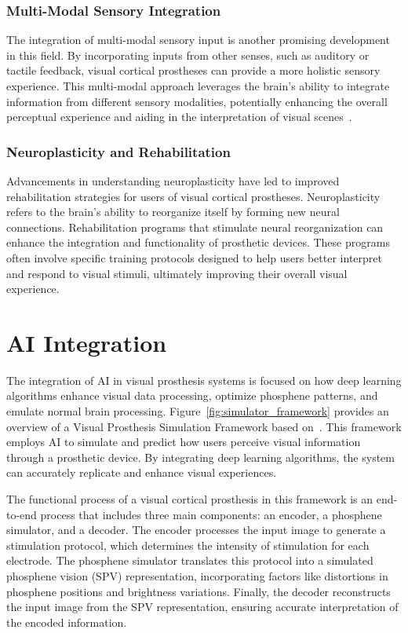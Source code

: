 \documentclass[twocolumn,10pt]{article}
\begin{document}
\subsubsection*{Multi-Modal Sensory Integration}
The integration of multi-modal sensory input is another promising development in
this field. By incorporating inputs from other senses, such as auditory or
tactile feedback, visual cortical prostheses can provide a more holistic sensory
experience. This multi-modal approach leverages the brain's ability to integrate
information from different sensory modalities, potentially enhancing the overall
perceptual experience and aiding in the interpretation of visual
scenes~\parencite{wanArtificialSensoryNeuron2020}.

\subsubsection*{Neuroplasticity and Rehabilitation}
Advancements in understanding neuroplasticity have led to improved
rehabilitation strategies for users of visual cortical prostheses.
Neuroplasticity refers to the brain's ability to reorganize itself by forming
new neural connections. Rehabilitation programs that stimulate neural
reorganization can enhance the integration and functionality of prosthetic
devices. These programs often involve specific training protocols designed to
help users better interpret and respond to visual stimuli, ultimately improving
their overall visual experience.

\section*{AI Integration}\label{sec:ai_integration}
The integration of AI in visual prosthesis systems is focused on how deep
learning algorithms enhance visual data processing, optimize phosphene patterns,
and emulate normal brain processing. Figure~\ref{fig:simulator_framework}
provides an overview of a Visual Prosthesis Simulation Framework based
on~\parencite{deruytervansteveninckEndtoendOptimizationProsthetic2022}. This
framework employs AI to simulate and predict how users perceive visual
information through a prosthetic device. By integrating deep learning
algorithms, the system can accurately replicate and enhance visual experiences.

The functional process of a visual cortical prosthesis in this framework is an
end-to-end process that includes three main components: an encoder, a phosphene
simulator, and a decoder. The encoder processes the input image to generate a
stimulation protocol, which determines the intensity of stimulation for each
electrode. The phosphene simulator translates this protocol into a simulated
phosphene vision (SPV) representation, incorporating factors like distortions in
phosphene positions and brightness variations. Finally, the decoder reconstructs
the input image from the SPV representation, ensuring accurate interpretation of
the encoded information.
\end{document}
